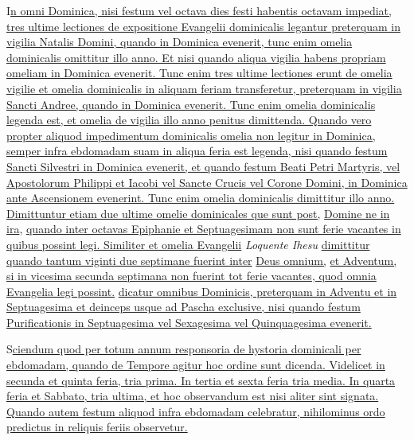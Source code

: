 \begin{multicols*}{2}
{\color{Red} }
\lettrine[lines=2]{\zallmancaps \color{Red} I}{}\ul{n omni Dominica, nisi festum vel octava dies festi habentis octavam impediat, tres ultime lectiones de expositione Evangelii dominicalis legantur preterquam in vigilia Natalis Domini, quando in Dominica evenerit, tunc enim omelia dominicalis omittitur illo anno. Et nisi quando aliqua vigilia habens propriam omeliam in Dominica evenerit. Tunc enim tres ultime lectiones erunt de omelia vigilie et omelia dominicalis in aliquam feriam transferetur, preterquam in vigilia Sancti Andree, quando in Dominica evenerit. Tunc enim omelia dominicalis legenda est, et omelia de vigilia illo anno penitus dimittenda. Quando vero propter aliquod impedimentum dominicalis omelia non legitur in Dominica, semper infra ebdomadam suam in aliqua feria est legenda, nisi quando festum Sancti Silvestri in Dominica evenerit, et quando festum Beati Petri Martyris, vel Apostolorum Philippi et Iacobi vel Sancte Crucis vel Corone Domini, in Dominica ante Ascensionem evenerint. Tunc enim omelia dominicalis dimittitur illo anno. Dimittuntur etiam due ultime omelie dominicales que sunt post,} \hyperlink{domine-ne-in-ira}{Domine ne in ira}, \ul{quando inter octavas Epiphanie et Septuagesimam non sunt ferie vacantes in quibus possint legi. Similiter et omelia Evangelii} \textit{Loquente Ihesu} \ul{dimittitur quando tantum viginti due septimane fuerint inter} \hyperlink{deus-omnium}{Deus omnium,} \ul{et Adventum, si in vicesima secunda septimana non fuerint tot ferie vacantes, quod omnia Evangelia legi possint.}
 \ul{dicatur omnibus Dominicis, preterquam in Adventu et in Septuagesima et deinceps usque ad Pascha exclusive, nisi quando festum Purificationis in Septuagesima vel Sexagesima vel Quinquagesima evenerit.}

{\color{Red} }
\lettrine[lines=2]{\zallmancaps \color{Blue} S}{}\ul{ciendum quod per totum annum responsoria de hystoria dominicali per ebdomadam, quando de Tempore agitur hoc ordine sunt dicenda. Videlicet in secunda et quinta feria, tria prima. In tertia et sexta feria tria media. In quarta feria et Sabbato, tria ultima, et hoc observandum est nisi aliter sint signata. Quando autem festum aliquod infra ebdomadam celebratur, nihilominus ordo predictus in reliquis feriis observetur.}


\end{multicols*}
